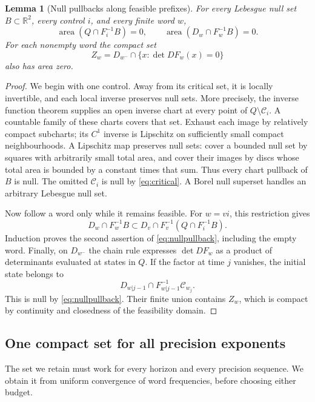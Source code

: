 \documentclass[11pt]{amsart}
\newtheorem{lemma}[theorem]{Lemma}
\theoremstyle{definition}
\theoremstyle{remark}
\newcommand{\R}{\mathbb R}
\newcommand{\area}{\operatorname{area}}
\numberwithin{equation}{section}
\begin{document}
\begin{lemma}[Null pullbacks along feasible prefixes]\label{lem:nullpullback}
For every Lebesgue null set \(B\subset\R^2\), every control \(i\),
and every finite word \(w\),
\begin{equation}\label{eq:nullpullback}
\area(Q\cap F_i^{-1}B)=0,\qquad
\area(D_w\cap F_w^{-1}B)=0.
\end{equation}
For each nonempty word the compact set
\begin{equation}\label{eq:compositecritical}
Z_w=D_{w^-}\cap\{x:\det DF_w(x)=0\}
\end{equation}
also has area zero.
\end{lemma}
\begin{proof}
We begin with one control. Away from its critical set, it is locally
invertible, and each local inverse preserves null sets. More
precisely, the inverse function theorem supplies an open inverse
chart at every point of \(Q\setminus\mathcal C_i\). A countable family of
these charts covers that set. Exhaust each image by relatively
compact subcharts; its \(C^1\) inverse is Lipschitz on sufficiently
small compact neighbourhoods. A Lipschitz map preserves null sets:
cover a bounded null set by squares with arbitrarily small total
area, and cover their images by discs whose total area is bounded
by a constant times that sum. Thus every chart pullback of \(B\)
is null. The omitted \(\mathcal C_i\) is null by
\eqref{eq:critical}. A Borel null superset handles an arbitrary
Lebesgue null set.

Now follow a word only while it remains feasible. For \(w=vi\),
this restriction gives
\[
D_w\cap F_w^{-1}B
\subset D_v\cap F_v^{-1}(Q\cap F_i^{-1}B).
\]
Induction proves the second assertion of \eqref{eq:nullpullback},
including the empty word.
Finally, on \(D_{w^-}\) the chain rule expresses \(\det DF_w\)
as a product of determinants evaluated at states in \(Q\).
If the factor at time \(j\) vanishes, the initial state belongs to
\[
D_{w|j-1}\cap F_{w|j-1}^{-1}\mathcal C_{w_j}.
\]
This is null by \eqref{eq:nullpullback}. Their finite union
contains \(Z_w\), which is compact by continuity and closedness
of the feasibility domain.
\end{proof}

\subsection{One compact set for all precision exponents}
The set we retain must work for every horizon and every precision
sequence. We obtain it from uniform convergence of word frequencies,
before choosing either budget.
\end{document}
